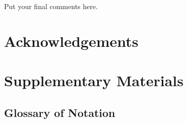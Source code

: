 \documentclass[useAMS,referee]{biom}
\begin{document}
Put your final comments here. 


\backmatter


\section*{Acknowledgements}


\section*{Supplementary Materials}

\newpage

\subsection{Glossary of Notation}
\end{document}
